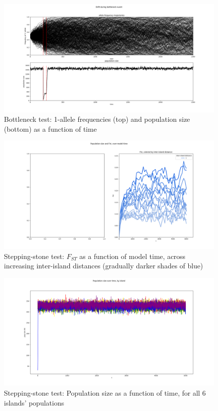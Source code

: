﻿\documentclass{article}
\begin{document}
\begin{figure}[h!]
\includegraphics[width=175mm]{./img/validation/bottleneck/alleles_seem_to_take_too_long_to_fix.png}
        \caption{Bottleneck test: 1-allele frequencies (top) and population size (bottom) as a function of time}
        \label{fig:bottleneck}
\end{figure}


\begin{figure}[h!]
\includegraphics[width=175mm]{./img/validation/stepping_stone/Fst_over_time_vs_interisland_dist.png}
        \caption{Stepping-stone test: $F_{ST}$ as a function of model time, across increasing inter-island distances (gradually darker shades of blue)}
        \label{fig:stepstone_Fst_by_dist}
\end{figure}


\begin{figure}[h!]
\includegraphics[width=175mm]{./img/validation/stepping_stone/pop_size_over_time.png}
\caption{Stepping-stone test: Population size as a function of time, for all 6 islands' populations}
        \label{fig:stepstone_popsize}
\end{figure}
\end{document}
